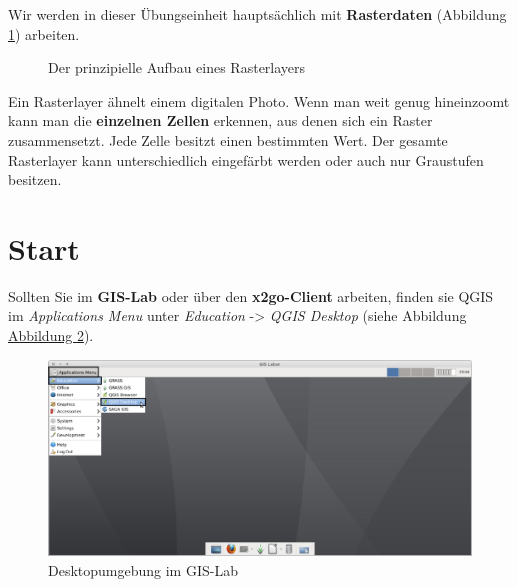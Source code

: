 \documentclass[a4paper,12pt,ngerman]{sphinxmanual}
\begin{document}
Wir werden in dieser Übungseinheit hauptsächlich mit \textbf{Rasterdaten} (Abbildung \hyperref[uebung2:figrasterlayer]{ \ref*{uebung2:figrasterlayer}}) arbeiten.
\begin{figure}[htbp]
\centering
\capstart

\caption{Der prinzipielle Aufbau eines Rasterlayers}\label{uebung2:figrasterlayer}\end{figure}

Ein Rasterlayer ähnelt einem digitalen Photo. Wenn man weit genug hineinzoomt kann man die \textbf{einzelnen Zellen} erkennen, aus denen sich ein Raster zusammensetzt. Jede Zelle besitzt einen bestimmten Wert. Der gesamte Rasterlayer kann unterschiedlich eingefärbt werden oder auch nur Graustufen besitzen.


\section{Start}
\label{uebung2:start}
Sollten Sie im \textbf{GIS-Lab} oder über den \textbf{x2go-Client} arbeiten, finden sie QGIS im \emph{Applications Menu} unter \emph{Education} -\textgreater{} \emph{QGIS Desktop} (siehe Abbildung \hyperref[uebung2:figserver]{Abbildung  \ref*{uebung2:figserver}}).
\begin{figure}[htbp]
\centering
\capstart

\includegraphics{server_desktop.png}
\caption{Desktopumgebung im GIS-Lab}\label{uebung2:figserver}\end{figure}
\end{document}

